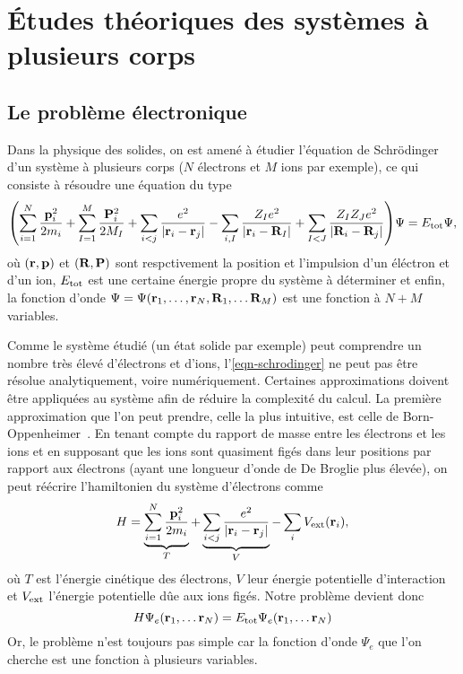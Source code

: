 \chapter{Études théoriques des systèmes à plusieurs corps}
\label{chap-theory}
\section{Le problème électronique}
Dans la physique des solides, on est amené à étudier l'équation de Schrödinger d'un système
à plusieurs corps ($N$ électrons et $M$ ions par exemple),
ce qui consiste à résoudre une équation du type
\begin{equation}
  \label{eqn-schrodinger}
  \qty(\sum_{i=1}^N \frac{\vb{p}_i^2}{2m_i}
  + \sum_{I=1}^M \frac{\vb{P}_i^2}{2M_I}
  + \sum_{i<j}\frac{e^2}{\abs{\vb{r}_i - \vb{r}_j}}
  - \sum_{i,I}\frac{Z_I e^2}{\abs{\vb{r}_i - \vb{R}_I}}
  + \sum_{I<J}\frac{Z_I Z_J e^2}{\abs{\vb{R}_i - \vb{R}_j}} )\Psi = E_{\textnormal{tot}}\Psi,
\end{equation}
où $(\vb{r}, \vb{p})$ et $(\vb{R}, \vb{P})$ sont respctivement la position et l'impulsion d'un éléctron et d'un ion,
$E_{\textnormal{tot}}$ est une certaine énergie propre du système à déterminer et enfin, la fonction d'onde
$\Psi = \Psi(\vb{r}_1, \ldots, \vb{r}_N,  \vb{R}_1, \ldots \vb{R}_M)$ est une fonction à $N+M$ variables.

Comme le système étudié (un état solide par exemple)
peut comprendre un nombre très élevé d'électrons et d'ions,
l'\cref{eqn-schrodinger} ne peut pas être résolue analytiquement, voire numériquement.
Certaines approximations doivent être appliquées au système afin de réduire la complexité du calcul.
La première approximation que l'on peut prendre, celle la plus intuitive,
est celle de Born-Oppenheimer~\cite{Born1927}.
En tenant compte du rapport de masse entre les électrons et les ions
et en supposant que les ions sont quasiment figés dans leur positions par rapport aux électrons
(ayant une longueur d'onde de De Broglie plus élevée),
on peut réécrire l'hamiltonien du système d'électrons comme
\begin{equation*}
  H = \underbrace{\sum_{i=1}^N\frac{\vb{p}_i^2}{2m_i}}_{T}
    + \underbrace{\sum_{i<j}\frac{e^2}{\abs{\vb{r}_i - \vb{r}_j}}}_{V}
    - \sum_i V_{\textnormal{ext}}(\vb{r}_i),
\end{equation*}
où $T$ est l'énergie cinétique des électrons, $V$ leur énergie potentielle d'interaction
et $V_{\textnormal{ext}}$ l'énergie potentielle dûe aux ions figés.
Notre problème devient donc
\begin{equation*}
  H\Psi_e(\vb{r}_1, \ldots \vb{r}_N) = E_{\textnormal{tot}} \Psi_e(\vb{r}_1, \ldots \vb{r}_N)
\end{equation*}
Or, le problème n'est toujours pas simple car la fonction d'onde $\Psi_e$
que l'on cherche est une fonction à plusieurs variables.

